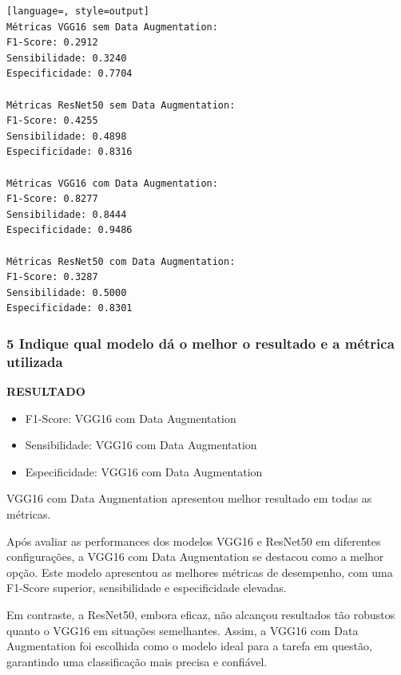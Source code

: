 \begin{lstlisting}[language=, style=output]
Métricas VGG16 sem Data Augmentation:
F1-Score: 0.2912
Sensibilidade: 0.3240
Especificidade: 0.7704

Métricas ResNet50 sem Data Augmentation:
F1-Score: 0.4255
Sensibilidade: 0.4898
Especificidade: 0.8316

Métricas VGG16 com Data Augmentation:
F1-Score: 0.8277
Sensibilidade: 0.8444
Especificidade: 0.9486

Métricas ResNet50 com Data Augmentation:
F1-Score: 0.3287
Sensibilidade: 0.5000
Especificidade: 0.8301
\end{lstlisting}

\subsubsection*{5 Indique qual modelo dá o melhor o resultado e a métrica utilizada}

\noindent\textbf{RESULTADO}
\begin{itemize}
    \item F1-Score: VGG16 com Data Augmentation
    \item Sensibilidade: VGG16 com Data Augmentation
    \item Especificidade: VGG16 com Data Augmentation
\end{itemize}

VGG16 com Data Augmentation apresentou melhor resultado em todas as métricas.

Após avaliar as performances dos modelos VGG16 e ResNet50 em diferentes configurações, a VGG16 com Data Augmentation se destacou como a melhor opção. Este modelo apresentou as melhores métricas de desempenho, com uma F1-Score superior, sensibilidade e especificidade elevadas.

Em contraste, a ResNet50, embora eficaz, não alcançou resultados tão robustos quanto o VGG16 em situações semelhantes. Assim, a VGG16 com Data Augmentation foi escolhida como o modelo ideal para a tarefa em questão, garantindo uma classificação mais precisa e confiável.